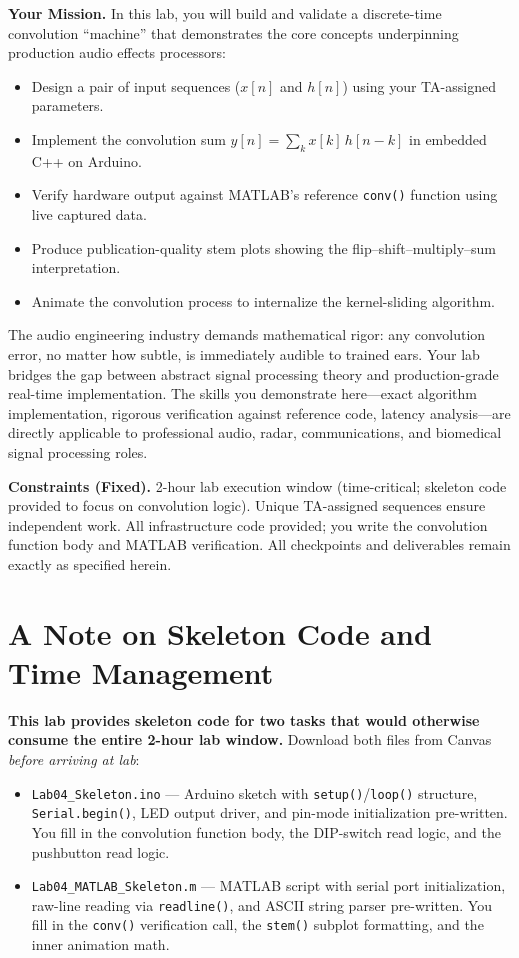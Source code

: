 \documentclass[11pt,letterpaper]{article}
\begin{document}
\noindent
\textbf{Your Mission.} In this lab, you will build and validate a discrete-time convolution ``machine'' that demonstrates the core concepts underpinning production audio effects processors:
\begin{itemize}
    \item Design a pair of input sequences ($x[n]$ and $h[n]$) using your TA-assigned parameters.
    \item Implement the convolution sum $y[n] = \sum_{k} x[k]\,h[n-k]$ in embedded C++ on Arduino.
    \item Verify hardware output against MATLAB's reference \texttt{conv()} function using live captured data.
    \item Produce publication-quality stem plots showing the flip--shift--multiply--sum interpretation.
    \item Animate the convolution process to internalize the kernel-sliding algorithm.
\end{itemize}

\noindent
The audio engineering industry demands mathematical rigor: any convolution error, no matter how subtle, is immediately audible to trained ears. Your lab bridges the gap between abstract signal processing theory and production-grade real-time implementation. The skills you demonstrate here---exact algorithm implementation, rigorous verification against reference code, latency analysis---are directly applicable to professional audio, radar, communications, and biomedical signal processing roles.

\noindent
\textbf{Constraints (Fixed).} 2-hour lab execution window (time-critical; skeleton code provided to focus on convolution logic). Unique TA-assigned sequences ensure independent work. All infrastructure code provided; you write the convolution function body and MATLAB verification. All checkpoints and deliverables remain exactly as specified herein.

\clearpage

\section*{A Note on Skeleton Code and Time Management}

\textbf{This lab provides skeleton code for two tasks that would otherwise consume the entire 2-hour lab window.} Download both files from Canvas \emph{before arriving at lab}:
\begin{itemize}
    \item \texttt{Lab04\_Skeleton.ino} --- Arduino sketch with \texttt{setup()}/\texttt{loop()} structure, \texttt{Serial.begin()}, LED output driver, and pin-mode initialization pre-written. You fill in the convolution function body, the DIP-switch read logic, and the pushbutton read logic.
    \item \texttt{Lab04\_MATLAB\_Skeleton.m} --- MATLAB script with serial port initialization, raw-line reading via \texttt{readline()}, and ASCII string parser pre-written. You fill in the \texttt{conv()} verification call, the \texttt{stem()} subplot formatting, and the inner animation math.
\end{itemize}
\end{document}
